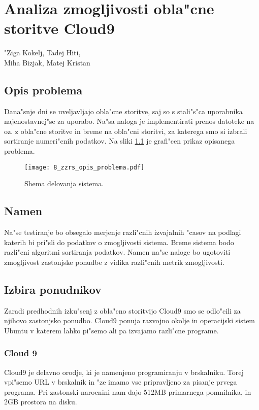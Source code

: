 \chapter[Analiza zmogljivosti obla"cne storitve c9]{Analiza zmogljivosti obla"cne storitve Cloud9}

\pagestyle{fancy}
\fancyhf{}
\fancyhead[LE,RO]{\thepage}
\fancyhead[RE,LO]{\leftmark}

\huge "Ziga Kokelj, Tadej Hiti,\\Miha Bizjak, Matej Kristan
\normalsize
\bigskip

\section{Opis problema} \label{8_opis_problema}
\noindent Dana"snje dni se uveljavljajo obla"cne storitve, saj so s stali"s"ca uporabnika najenostavnej"se za uporabo. Na"sa naloga je implementirati prenos datoteke na oz. z obla"cne storitve in breme na obla"cni storitvi, za katerega smo si izbrali sortiranje numeri"cnih podatkov.
\noindent Na sliki \ref{8_opis_problema} je grafi"cen prikaz opisanega problema.

\begin{figure}
  \centering
    \texttt{[image: 8\_zzrs\_opis\_problema.pdf]}
  \caption{Shema delovanja sistema.}
  \label{8_opis_problema}
\end{figure}


\section{Namen}
Na"se testiranje bo obsegalo merjenje razli"cnih izvajalnih "casov na podlagi katerih bi pri"sli do podatkov o zmogljivosti sistema. Breme sistema bodo razli"cni algoritmi sortiranja podatkov. Namen na"se naloge bo ugotoviti zmogljivost zastonjske ponudbe z vidika razli"cnih metrik zmogljivosti.


\section{Izbira ponudnikov}
Zaradi predhodnih izku"senj z obla"cno storitvijo Cloud9 smo se odlo"cili za njihovo zastonjsko ponudbo. Cloud9 ponuja razvojno okolje in operacijski sistem Ubuntu v katerem lahko pi"semo ali pa izvajamo razli"cne programe.

\subsection{Cloud 9}
Cloud9 je delavno orodje, ki je namenjeno programiranju v brskalniku. Torej vpi"semo URL v brskalnik in "ze imamo vse pripravljeno za pisanje prvega programa. Pri zastonski narocnini nam dajo 512MB primarnega pomnilnika, in 2GB prostora na disku.

